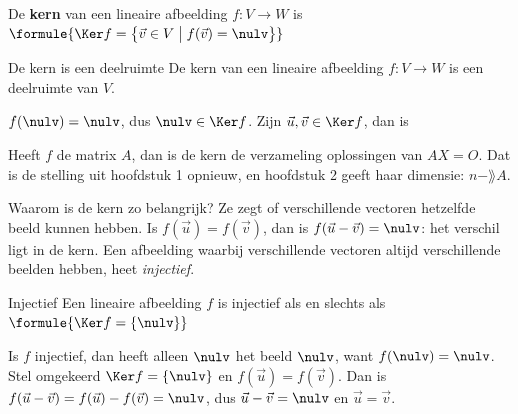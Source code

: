 \begin{theorie}
De \textbf{\textcolor{accent}{kern}} van een lineaire afbeelding $f \colon V \to W$ is \quad $\formule{\Ker f = \bigl\{\vec v \in V \bigm| f(\vec v) = \nulv\bigr\}}$

\begin{stelling}{De kern is een deelruimte}
De kern van een lineaire afbeelding $f \colon V \to W$ is een deelruimte van $V$.
\end{stelling}

\begin{bewijs}
$f(\nulv) = \nulv$, dus $\nulv \in \Ker f$. Zijn $\vec u, \vec v \in \Ker f$, dan is
\end{bewijs}
\end{theorie}

Heeft $f$ de matrix $A$, dan is de kern de verzameling oplossingen van $AX = O$. Dat is de stelling uit hoofdstuk 1 opnieuw, en hoofdstuk 2 geeft haar dimensie: $n - \rang A$.


Waarom is de kern zo belangrijk? Ze zegt of verschillende vectoren hetzelfde beeld kunnen hebben. Is $f(\vec u) = f(\vec v)$, dan is $f(\vec u - \vec v) = \nulv$: het verschil ligt in de kern. Een afbeelding waarbij verschillende vectoren altijd verschillende beelden hebben, heet \textit{injectief}.

\begin{theorie}
\begin{stelling}{Injectief}
Een lineaire afbeelding $f$ is injectief als en slechts als \quad $\formule{\Ker f = \{\nulv\}}$
\end{stelling}

\begin{bewijs}
Is $f$ injectief, dan heeft alleen $\nulv$ het beeld $\nulv$, want $f(\nulv) = \nulv$. Stel omgekeerd $\Ker f = \{\nulv\}$ en $f(\vec u) = f(\vec v)$. Dan is $f(\vec u - \vec v) = f(\vec u) - f(\vec v) = \nulv$, dus $\vec u - \vec v = \nulv$ en $\vec u = \vec v$.
\end{bewijs}
\end{theorie}

